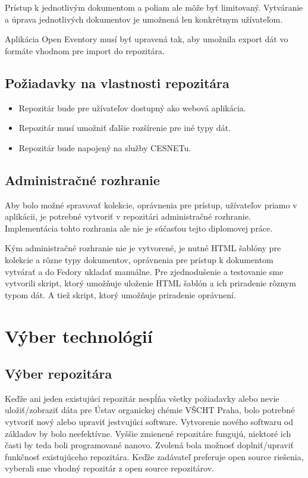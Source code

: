 \documentclass[thesis=M,slovak]{FITthesis}[2013/05/06]
\begin{document}
Prístup k jednotlivým dokumentom a poliam ale môže byť limitovaný. Vytváranie a úprava jednotlivých dokumentov je umožnená len konkrétnym užívateľom.

Aplikácia Open Eventory musí byť upravená tak, aby umožnila export dát vo formáte vhodnom pre import do repozitára.

\subsection{Požiadavky na vlastnosti repozitára}
\begin{itemize}
	\item Repozitár bude pre užívateľov dostupný ako webová aplikácia.
	\item Repozitár musí umožniť ďalšie rozšírenie pre iné typy dát.
	\item Repozitár bude napojený na služby CESNETu.
\end{itemize}

\subsection{Administračné rozhranie}
Aby bolo možné spravovať kolekcie, oprávnenia pre prístup, užívateľov priamo v aplikácii, je potrebné vytvoriť v repozitári administračné rozhranie. Implementácia tohto rozhrania ale nie je súčasťou tejto diplomovej práce. 

Kým administračné rozhranie nie je vytvorené, je nutné HTML šablóny pre kolekcie a rôzne typy dokumentov, oprávnenia pre prístup k dokumentom vytvárať a do Fedory ukladať manuálne. Pre zjednodušenie a testovanie sme vytvorili skript, ktorý umožňuje uloženie HTML šablón a ich priradenie rôznym typom dát. A tiež skript, ktorý umožňuje priradenie oprávnení.

\section{Výber technológií}
\subsection{Výber repozitára}
Keďže ani jeden existujúci repozitár nespĺňa všetky požiadavky alebo nevie uložiť/zobraziť dáta pre Ústav organickej chémie VŠCHT Praha, bolo potrebné vytvoriť nový alebo upraviť jestvujúci software. Vytvorenie nového softwaru od základov by bolo neefektívne. Vyššie zmienené repozitáre fungujú, niektoré ich časti by teda boli programované nanovo. Zvolená bola možnosť doplniť/upraviť funkčnosť existujúceho repozitára. Keďže zadávateľ preferuje open source riešenia, vyberali sme vhodný repozitár z open source repozitárov.
\end{document}

